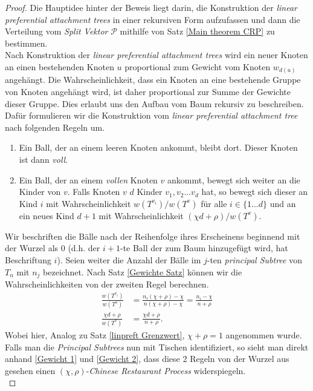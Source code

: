 \begin{proof}
    Die Hauptidee hinter der Beweis liegt darin, die Konstruktion der \textit{linear preferential attachment trees} in einer rekursiven Form aufzufassen und dann die Verteilung vom \textit{Split Vektor} $\mathcal{P}$ mithilfe von Satz \ref{Main theorem CRP} zu bestimmen.\\
    Nach Konstruktion der \textit{linear preferential attachment trees} wird ein neuer Knoten an einen bestehenden Knoten $u$ proportional zum Gewicht vom Knoten $w_{d(u)}$ angehängt. Die Wahrscheinlichkeit, dass ein Knoten an eine bestehende Gruppe von Knoten angehängt wird, ist daher proportional zur Summe der Gewichte dieser Gruppe. Dies erlaubt uns den Aufbau vom Baum rekursiv zu beschreiben. Dafür formulieren wir die Konstruktion vom \textit{linear preferential attachment tree} nach folgenden Regeln um.
    \begin{enumerate}
        \item Ein Ball, der an einem leeren Knoten ankommt, bleibt dort. Dieser Knoten ist dann \textit{voll}.
        \item Ein Ball, der an einem \textit{vollen} Knoten $v$ ankommt, bewegt sich weiter an die Kinder von $v$. Falls Knoten $v$ $d$ Kinder $v_1,v_2...v_d$ hat, so bewegt sich dieser an Kind $i$ mit Wahrscheinlichkeit $w(T^{v_i})/w(T^{v})$ für alle $i \in \{1...d\}$ und an ein neues Kind $d+1$ mit Wahrscheinlichkeit $(\chi d + \rho)/w(T^{v})$.
    \end{enumerate} 
    Wir beschriften die Bälle nach der Reihenfolge ihres Erscheinens beginnend mit der Wurzel als $0$ (d.h. der $i+1$-te Ball der zum Baum hinzugefügt wird, hat Beschriftung $i$). Seien weiter die Anzahl der Bälle im $j$-ten \textit{principal Subtree} von $T_n$ mit $n_j$ bezeichnet.
    Nach Satz \ref{Gewichte Satz} können wir die Wahrscheinlichkeiten von der zweiten Regel berechnen.
    \begin{align}
         \frac{w(T^{v_i})}{w(T^{v})} &= \frac{n_i(\chi + \rho) - \chi}{n(\chi+ \rho) - \chi} = \frac{n_i - \chi}{ n + \rho} \label{Gewicht 1}\\  
         \frac{\chi d + \rho}{w(T^{v})} &= \frac{\chi d + \rho}{ n + \rho} \label{Gewicht 2}.
    \end{align}
    Wobei hier, Analog zu Satz \ref{linpreft Grenzwert}, $\chi + \rho = 1$ angenommen wurde.  Falls man die \textit{Principal Subtrees} nun mit Tischen identifiziert, so sieht man direkt anhand \ref{Gewicht 1} und \ref{Gewicht 2}, dass diese 2 Regeln von der Wurzel aus gesehen einen $(\chi,\rho)$-\textit{Chinese Restaurant Process} widerspiegeln.\\

\end{proof}
